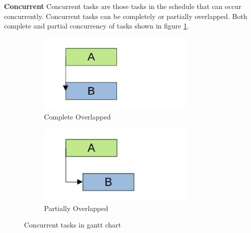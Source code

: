 \begin{spacing}{1}
\textbf{Concurrent}\newline
Concurrent tasks are those tasks in the schedule that can occur concurrently. Concurrent tasks can be completely or partially overlapped. Both complete and partial concurrency of tasks shown in figure \ref{fig:conc}. 
\begin{figure}[h]
	\centering
	\begin{subfigure}{0.4\textwidth}
		\centering
		\includegraphics[height=1.5in]{c_ol}
		\caption{Complete Overlapped}
	\end{subfigure}
	\begin{subfigure}{0.4\textwidth}
		\centering
		\includegraphics[height=1.5in]{p_ol}
		\caption{Partially Overlapped}
	\end{subfigure}
	\caption{Concurrent tasks in gantt chart}
	\label{fig:conc}
\end{figure}
     

\end{spacing}
